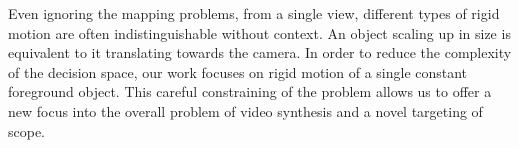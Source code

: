 Even ignoring the mapping problems, from a single view, different types of rigid motion are often indistinguishable without context. An object scaling up in size is equivalent to it translating towards the camera. In order to reduce the complexity of the decision space, our work focuses on rigid motion of a single constant foreground object. This careful constraining of the problem allows us to offer a new focus into the overall problem of video synthesis and a novel targeting of scope.

